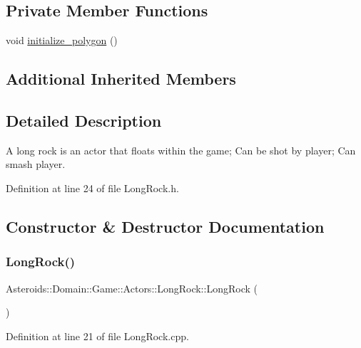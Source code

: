 \subsection*{Private Member Functions}
\begin{DoxyCompactItemize}
\item 
void \hyperlink{classAsteroids_1_1Domain_1_1Game_1_1Actors_1_1LongRock_ac2469234e9ea81472af9e7297ff8a75a}{initialize\+\_\+polygon} ()
\end{DoxyCompactItemize}
\subsection*{Additional Inherited Members}


\subsection{Detailed Description}
A long rock is an actor that floats within the game; Can be shot by player; Can smash player. 

Definition at line 24 of file Long\+Rock.\+h.



\subsection{Constructor \& Destructor Documentation}
\mbox{\label{classAsteroids_1_1Domain_1_1Game_1_1Actors_1_1LongRock_a076888291134eee7db8c6a94ebc0ad8d}} 
\subsubsection{\texorpdfstring{Long\+Rock()}{LongRock()}}
{\footnotesize\ttfamily Asteroids\+::\+Domain\+::\+Game\+::\+Actors\+::\+Long\+Rock\+::\+Long\+Rock (\begin{DoxyParamCaption}{ }\end{DoxyParamCaption})}



Definition at line 21 of file Long\+Rock.\+cpp.



